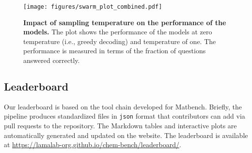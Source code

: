 \begin{figure}[!h]
    \centering
    \texttt{[image: figures/swarm\_plot\_combined.pdf]}
    \caption{\textbf{Impact of sampling temperature on the performance of the models.} The plot shows the performance of the models at zero temperature (i.e., greedy decoding) and temperature of one. The performance is measured in terms of the fraction of questions answered correctly.}
    \label{fig:temperature_impact}
\end{figure}





\clearpage
\subsection{Leaderboard}
\label{sec:leaderboard}
Our leaderboard is based on the tool chain developed for Matbench.\autocite{Dunn_2020}
Briefly, the \chembench pipeline produces standardized files in \texttt{json} format that contributors can add via pull requests to the \chembench repository.
The Markdown tables and interactive plots are automatically generated and updated on the \chembench website. The leaderboard is available at \url{https://lamalab-org.github.io/chem-bench/leaderboard/}.

\clearpage

\printnoidxglossary[type=\acronymtype, nonumberlist]  %
